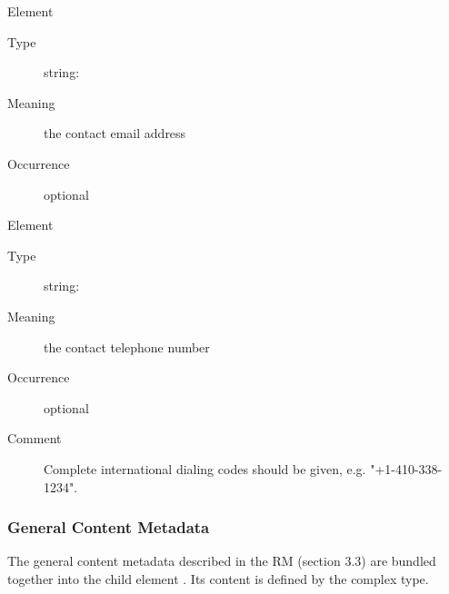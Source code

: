 \documentclass[11pt,a4paper]{ivoa}
\begin{document}
\begin{generated}
\begin{bigdescription}
\begin{description}
\end{description}
\item[Element \xmlel{email}]
\begin{description}
\item[Type] string: 
\item[Meaning] the contact email address
\item[Occurrence] optional

\end{description}
\item[Element \xmlel{telephone}]
\begin{description}
\item[Type] string: 
\item[Meaning] the contact telephone number
\item[Occurrence] optional
\item[Comment] 
                Complete international dialing codes should be given, e.g.
                {"}+1-410-338-1234{"}.
              

\end{description}


\end{bigdescription}\endgroup

\endgroup
\end{generated}




\subsubsection{General Content Metadata}


The general content metadata described in the RM
(section 3.3) are bundled together into the 
child element .  Its content is
defined by the  complex type.
\end{document}
